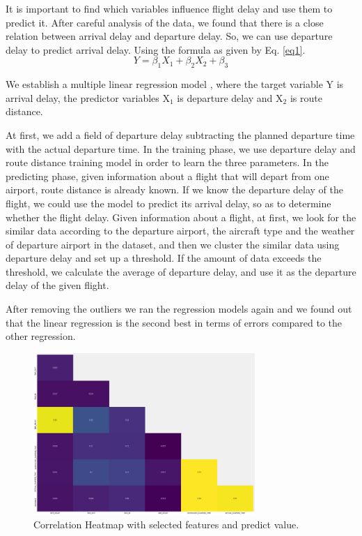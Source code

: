 \documentclass[conference]{IEEEtran}
\begin{document}
It is important to find which variables influence flight delay and use them to predict it. After careful analysis of the data, we found that there is a close relation between arrival delay and departure delay. So, we can use departure delay to predict arrival delay. Using the formula as given by Eq. \ref{eq1}.
\begin{equation}\label{eq1}
    Y=\beta_1X_1+\beta_2X_2+\beta_3
\end{equation}


We establish a multiple linear regression model , where the target variable Y is arrival delay, the predictor variables X$_1$ is departure delay and X$_2$ is route distance.

At first, we add a field of departure delay subtracting the planned departure time with the actual departure time. In the training phase, we use departure delay and route distance training model in order to learn the three parameters. In the predicting phase, given information about a flight that will depart from one airport, route distance is already known. If we know the departure delay of the flight, we could use the model to predict its arrival delay, so as to determine whether the flight delay. Given information about a flight, at first, we look for the similar data according to the departure airport, the aircraft type and the weather of departure airport in the dataset, and then we cluster the similar data using departure delay and set up a threshold. If the amount of data exceeds the threshold, we calculate the average of departure delay, and use it as the departure delay of the given flight.

After removing the outliers we ran the regression models again and we found out that the linear regression is the second best in terms of errors compared to the other regression. 

\begin{figure} [!t]
\centering
\includegraphics[clip, width=0.75\textwidth]{rsz_cleaned.png}
\caption{Correlation Heatmap with selected features and predict value.}
\label{fig:ch}
\end{figure}  
\end{document}
